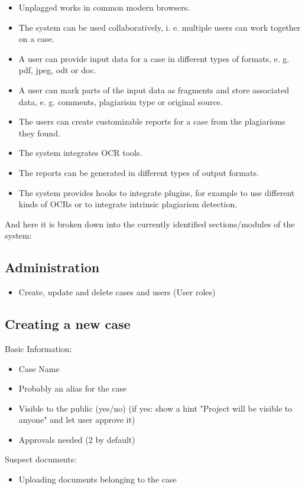 \begin{itemize}
\item Unplagged works in common modern browsers.
\item The system can be used collaboratively, i. e. multiple users can work together on a case.
\item A user can provide input data for a case in different types of formats, e. g. pdf, jpeg, odt or doc.
\item A user can mark parts of the input data as fragments and store associated data, e. g. comments, plagiarism type or original source.
\item The users can create customizable reports for a case from the plagiarisms they found.
\item The system integrates OCR tools.
\item The reports can be generated in different types of output formats.
\item The system provides hooks to integrate plugins, for example to use different kinds of OCRs or to integrate intrinsic plagiarism detection.
\end{itemize}

And here it is broken down into the currently identified sections/modules of the system:

\subsection{Administration}

\begin{itemize}
\item Create, update and delete cases and users (User roles)
\end{itemize}

\subsection{Creating a new case}

Basic Information:
\begin{itemize}
\item Case Name
\item Probably an alias for the case
\item Visible to the public (yes/no) (if yes: show a hint "Project will be visible to anyone" and let user approve it)
\item Approvals needed (2 by default)
\end{itemize}

Suspect documents:
\begin{itemize}
\item Uploading documents belonging to the case
\end{itemize}


